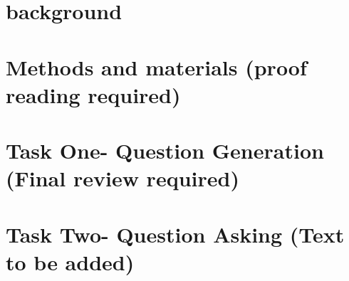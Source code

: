 \documentclass[11pt, a4paper]{article}
\begin{document}














\newpage

\section{background}
\label{sec:background}


\newpage

\section{Methods and materials (proof reading required)}
\label{sec:methods}


\newpage

\section{Task One- Question Generation (Final review required)}
\label{sec:task1}



\section{Task Two- Question Asking (Text to be added)}
\label{sec:task2}

\end{document}
